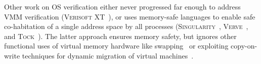 
Other work on OS verification either never progressed far enough to address VMM verification 
(\textsc{Verisoft XT}~\cite{cohen2009vcc,cohen2010local,dahlweid2009vcc,cohen2013SOFSEM}), or uses memory-safe languages to enable safe co-habitation 
of a single address space by all processes (\textsc{Singularity}~\cite{Fahndrich2006language,Hunt2007singularity,Hunt2007sealing,Barnett2011specsharp}, \textsc{Verve}~\cite{Yang2010Verve},
and \textsc{Tock}~\cite{levy2017multiprogramming}). The latter approach ensures memory safety, but ignores other functional uses of virtual memory
hardware like swapping~\cite{Denning1970VM} or exploiting copy-on-write techniques for dynamic migration of virtual machines~\cite{clark2005live}.

